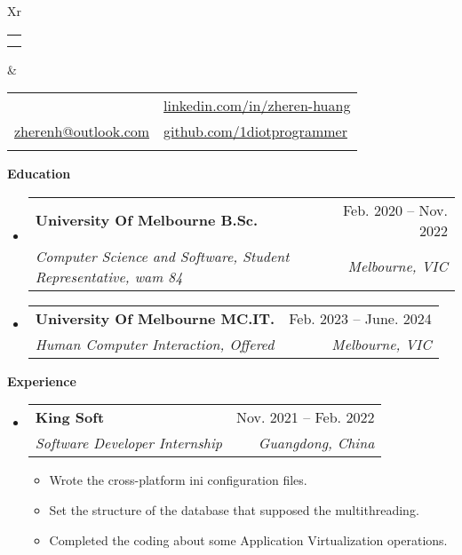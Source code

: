 \documentclass[letterpaper,12pt]{article}[leftmargin=*]
\makeatletter
\def \fullname {Zheren Huang}
\def \subtitle {}
\def \linkedinicon {\faLinkedin}
\def \linkedinlink {https://linkedin.com/in/zheren-huang-9133a6235/}
\def \linkedintext {linkedin.com/in/zheren-huang}
\def \phoneicon {\faPhone}
\def \phonetext {+61 466641756}
\def \emailicon {\faEnvelope}
\def \emaillink {mailto:zherenh@outlook.com}
\def \emailtext {zherenh@outlook.com}
\def \githubicon {\faGithub}
\def \githublink {https://github.com/1diotprogrammer}
\def \githubtext {github.com/1diotprogrammer}
\def \headertype {\doublecol}
\def \entryspacing {-0pt}
\def \linkedin {\linkedinicon \hspace{3pt}\href{\linkedinlink}{\linkedintext}}
\def \phone {\phoneicon \hspace{3pt}{ \phonetext}}
\def \email {\emailicon \hspace{3pt}\href{\emaillink}{\emailtext}}
\def \github {\githubicon \hspace{3pt}\href{\githublink}{\githubtext}}
\def \website {\websiteicon \hspace{3pt}\href{\websitelink}{\websitetext}}
\renewcommand{\section}[2]{\vspace{5pt}
  \colorbox{secondary}{\color{white}\raggedbottom\normalsize\textbf{{#1}{\hspace{7pt}#2}}}
}
\newcommand{\resumeEntryStart}{\begin{itemize}[leftmargin=2.5mm]}
\newcommand{\resumeEntryEnd}{\end{itemize}\vspace{\entryspacing}}
\newcommand{\resumeItemListStart}{\begin{itemize}[leftmargin=4.5mm]}
\newcommand{\resumeItemListEnd}{\end{itemize}}
\newcommand{\resumeItem}[1]{
  \item\small{
    {#1 \vspace{-2pt}}
  }
}
\newcommand{\resumeEntryTSDL}[4]{
  \vspace{-1pt}\item[]
    \begin{tabularx}{0.97\textwidth}{X@{\hspace{60pt}}r}
      \textbf{\color{primary}#1} & {\firabook\color{accent}\small#2} \\
      \textit{\color{accent}\small#3} & \textit{\color{accent}\small#4} \\
    \end{tabularx}\vspace{-6pt}
}
\newcommand{\doublecol}[6]{
  \begin{tabularx}{\textwidth}{Xr}
    {
      \begin{tabular}[c]{l}
        \fontsize{35}{45}\selectfont{\color{primary}{{\textbf{\fullname}}}} \\
        {\textit{\subtitle}} 
      \end{tabular}
    } & {
      \begin{tabular}[c]{l@{\hspace{1.5em}}l}
        {\small#4} & {\small#1} \\
        {\small#5} & {\small#2} \\
        {\small#6} & {\small#3}
      \end{tabular}
    }
  \end{tabularx}
}
\makeatother
\begin{document}
\headertype{\linkedin}{\github}{\website}{\phone}{\email}{} 
\vspace{-10pt}  


\section{\faGraduationCap}{Education}

  \resumeEntryStart
    \resumeEntryTSDL
      {University Of Melbourne B.Sc.}{Feb. 2020 -- Nov. 2022}
      {Computer Science and Software, Student Representative, wam 84}{Melbourne, VIC}
  \resumeEntryEnd
  
  \resumeEntryStart
    \resumeEntryTSDL
      {University Of Melbourne MC.IT.}{Feb. 2023 -- June. 2024}
      {Human Computer Interaction, Offered}{Melbourne, VIC}
  \resumeEntryEnd
  
  


\section{\faPieChart}{Experience}

  \resumeEntryStart
    \resumeEntryTSDL
      {King Soft}{Nov. 2021 -- Feb. 2022}
      {Software Developer Internship}{Guangdong, China}
    \resumeItemListStart
      \resumeItem {Wrote the cross-platform ini configuration files.}
      \resumeItem {Set the structure of the database that supposed the multithreading.}
      \resumeItem {Completed the coding about some Application Virtualization operations.}
    \resumeItemListEnd
  \resumeEntryEnd
  
\end{document}

